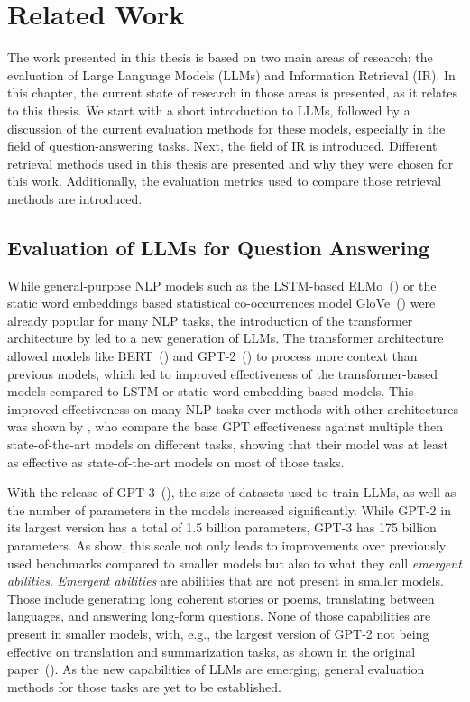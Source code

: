\chapter{Related Work}\label{related-work}
The work presented in this thesis is based on two main areas of research: the evaluation of Large Language Models (LLMs) and Information Retrieval (IR).
In this chapter, the current state of research in those areas is presented, as it relates to this thesis.
We start with a short introduction to LLMs, followed by a discussion of the current evaluation methods for these models, especially in the field of question-answering tasks.
Next, the field of IR is introduced.
Different retrieval methods used in this thesis are presented and why they were chosen for this work.
Additionally, the evaluation metrics used to compare those retrieval methods are introduced.

\section{Evaluation of LLMs for Question Answering}\label{sec:evaluation-of-large-language-models}
While general-purpose NLP models such as the LSTM-based ELMo~(\cite{peters:2018:Deep}) or the static word embeddings based statistical co-occurrences model GloVe~(\cite{pennington:2014:Glove}) were already popular for many NLP tasks, the introduction of the transformer architecture by \cite{vaswani:2017:Attention} led to a new generation of LLMs.
The transformer architecture allowed models like BERT~(\cite{devlin:2018:BERT}) and GPT-2~(\cite{radford:2019:language}) to process more context than previous models, which led to improved effectiveness of the transformer-based models compared to LSTM or static word embedding based models.
This improved effectiveness on many NLP tasks over methods with other architectures was shown by \cite{radford:2019:language}, who compare the base GPT effectiveness against multiple then state-of-the-art models on different tasks, showing that their model was at least as effective as state-of-the-art models on most of those tasks.

With the release of GPT-3~(\cite{brown:2020:Language}), the size of datasets used to train LLMs, as well as the number of parameters in the models increased significantly.
While GPT-2 in its largest version has a total of 1.5 billion parameters, GPT-3 has 175 billion parameters.
As \cite{wei:2022:Emergent} show, this scale not only leads to improvements over previously used benchmarks compared to smaller models but also to what they call \textit{emergent abilities}.
\textit{Emergent abilities} are abilities that are not present in smaller models.
Those include generating long coherent stories or poems, translating between languages, and answering long-form questions.
None of those capabilities are present in smaller models, with, e.g., the largest version of GPT-2 not being effective on translation and summarization tasks, as shown in the original paper~(\cite{radford:2019:language}).
As the new capabilities of LLMs are emerging, general evaluation methods for those tasks are yet to be established.

